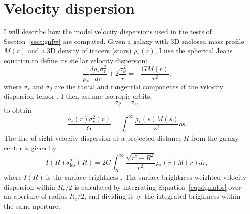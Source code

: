 \documentclass[usenatbib]{mnras}
\def\reff{R_e}
\def\Sref#1{Section~\ref{#1}\xspace}
\def\Eref#1{Equation~\ref{#1}\xspace}
\begin{document}
\section{Velocity dispersion}\label{sect:appendixd}
I will describe how the model velocity dispersions used in the tests of \Sref{sect:gnfw} are computed.
Given a galaxy with 3D enclosed mass profile $M(r)$ and a 3D density of tracers (stars) $\rho_*(r)$, I use the spherical Jeans equation to define its stellar velocity dispersion:
\begin{equation}
\frac{1}{\rho_*}\frac{d\rho_*\sigma_r^2}{dr} + 2\frac{\sigma_\theta^2}{r} = -\frac{GM(r)}{r^2},
\end{equation}
where $\sigma_r$ and $\sigma_\theta$ are the radial and tangential components of the velocity dispersion tensor \citep{B+T87}.
I then assume isotropic orbits,
\begin{equation}
\sigma_\theta = \sigma_r,
\end{equation}
to obtain
\begin{equation}
\frac{\rho_*(r)\sigma_r^2(r)}{G} = \int_r^\infty \frac{\rho_*(s) M(s)}{s^2}ds.
\end{equation}
The line-of-sight velocity dispersion at a projected distance $R$ from the galaxy center is given by
\begin{equation}\label{eq:sigmalos}
I(R)\sigma_{\mathrm{los}}^2(R) = 2G \int_R^\infty \frac{\sqrt{r^2 - R^2}}{r^2}\rho_*(r)M(r)dr,
\end{equation}
where $I(R)$ is the surface brightness \citep{P+S97}. The surface brightness-weighted velocity dispersion within $\reff/2$ is calculated by integrating \Eref{eq:sigmalos} over an aperture of radius $\reff/2$, and dividing it by the integrated brightness within the same aperture.
\end{document}
